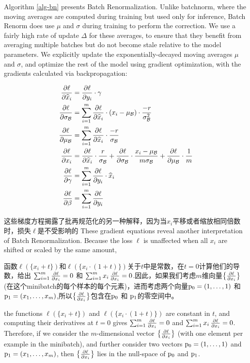 Algorithm \ref{alg-bn} presents Batch Renormalization. Unlike batchnorm, where the moving averages are computed during training but used only for inference, Batch Renorm does use $\mu$ and $\sigma$ during training to perform the correction. We use a fairly high rate of update $\Delta$ for these averages, to ensure that they benefit from averaging multiple batches but do not become stale relative to the model parameters. We explicitly update the exponentially-decayed moving averages $\mu$ and $\sigma$, and optimize the rest of the model using gradient optimization, with the gradients calculated via backpropagation:

\begin{align*}
\frac{\partial \ell}{\partial \widehat{x}_i} &= \frac{\partial \ell}{\partial y_i}\cdot \gamma \\
\frac{\partial \ell}{\partial \sigma_{\mathcal{B}}}
&= \sum_{i=1}^m \frac{\partial \ell}{\partial \widehat{x}_i}\cdot(x_i-\mu_{\mathcal{B}})\cdot
\frac{-r}{\sigma_{\mathcal{B}}^2} \\
\frac{\partial \ell}{\partial \mu_{\mathcal{B}}} &=
\sum_{i=1}^m \frac{\partial \ell}{\partial \widehat{x}_i}\cdot
\frac{-r}{\sigma_{\mathcal{B}}}\\
   \frac{\partial \ell}{\partial x_i} &= \frac{\partial \ell}{\partial \widehat{x}_i} \cdot
\frac{r}{\sigma_{\mathcal{B}}} + \frac{\partial \ell}{\partial \sigma_{\mathcal{B}}}\cdot
\frac{x_i-\mu_{\mathcal{B}}}{m \sigma_{\mathcal{B}}} + \frac{\partial \ell}{\partial \mu_{\mathcal{B}}}\cdot \frac{1}{m}\\
\frac{\partial \ell}{\partial \gamma}&= \sum_{i=1}^m \frac{\partial \ell}{\partial y_i} \cdot \widehat{x}_i
  \\
  \frac{\partial \ell}{\partial \beta} &= \sum_{i=1}^m \frac{\partial \ell}{\partial y_i}
\end{align*}

这些梯度方程揭露了批再规范化的另一种解释，因为当$x_i$平移或者缩放相同倍数时，损失$\ell$是不受影响的
These gradient equations reveal another interpretation of Batch Renormalization. Because the loss $\ell$ is unaffected when all $x_i$ are shifted or scaled by the same amount,

函数$\ell(\{x_i+t\})$和$\ell(\{x_i\cdot(1+t)\})$关于$t$中是常数，在$t=0$计算他们的导数，给出
$\sum_{i=1}^m \frac{\partial \ell}{\partial x_i} = 0$ 和 $\sum_{i=1}^m x_i\,\frac{\partial \ell}{\partial x_i} = 0$.因此，如果我们考虑$m$维向量$\big\{\frac{\partial \ell}{\partial x_i}\big\}$(在这个minibatch的每个样本的每个元素)，进而考虑两个向量$\mathrm{p}_0=(1,\ldots,1)$ 和 $\mathrm{p}_1=(x_1,\ldots,x_m)$,所以$\big\{\frac{\partial \ell}{\partial x_i}\big\}$包含在$\mathrm{p}_0$ 和 $\mathrm{p}_1$的零空间中。

the functions $\ell(\{x_i+t\})$ and $\ell(\{x_i\cdot(1+t)\})$ are constant in $t$, and computing their derivatives at $t=0$ gives $\sum_{i=1}^m \frac{\partial \ell}{\partial x_i} = 0$ and $\sum_{i=1}^m x_i\,\frac{\partial \ell}{\partial x_i} = 0$. Therefore, if we consider the $m$-dimensional vector $\big\{\frac{\partial \ell}{\partial x_i}\big\}$ (with one element per example in the minibatch), and further consider two vectors
$\mathrm{p}_0=(1,\ldots,1)$ and $\mathrm{p}_1=(x_1,\ldots,x_m)$, then $\big\{\frac{\partial \ell}{\partial x_i}\big\}$ lies in the null-space of $\mathrm{p}_0$ and $\mathrm{p}_1$.

